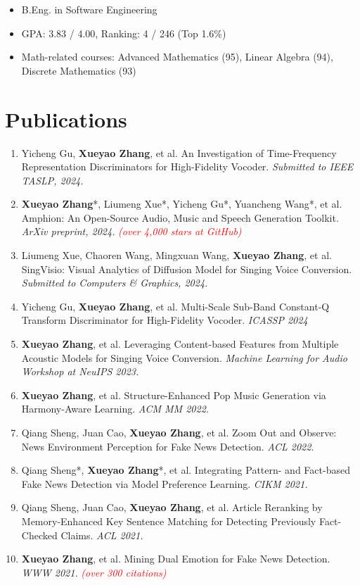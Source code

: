 \documentclass{resume}
\begin{document}
{
  \small
  \begin{itemize}
    \item B.Eng. in Software Engineering
    \item GPA: 3.83 / 4.00, Ranking: 4 / 246 (Top 1.6\%)
    \item Math-related courses: Advanced Mathematics (95), Linear Algebra (94), Discrete
          Mathematics (93)
  \end{itemize}
}

\section{Publications}

\begin{enumerate}\itemsep 0.5em
  \item Yicheng Gu, \textbf{Xueyao Zhang}, et al. An Investigation of Time-Frequency Representation Discriminators for High-Fidelity Vocoder. \textit{Submitted to IEEE TASLP, 2024.}
  \item \textbf{Xueyao Zhang}*, Liumeng Xue*, Yicheng Gu*, Yuancheng Wang*, et al. Amphion: An Open-Source Audio, Music and Speech Generation Toolkit. \textit{ArXiv preprint, 2024.} \textcolor{red}{\textit{(over 4,000 stars at GitHub)}}
  \item Liumeng Xue, Chaoren Wang, Mingxuan Wang, \textbf{Xueyao Zhang}, et al. SingVisio: Visual Analytics of Diffusion Model for Singing Voice Conversion. \textit{Submitted to Computers \& Graphics, 2024.}
  \item Yicheng Gu, \textbf{Xueyao Zhang}, et al. Multi-Scale Sub-Band Constant-Q Transform Discriminator for High-Fidelity Vocoder. \textit{ICASSP 2024}
  \item \textbf{Xueyao Zhang}, et al. Leveraging Content-based Features from Multiple Acoustic Models for Singing Voice Conversion. \textit{Machine Learning for Audio Workshop at NeuIPS 2023.}
  \item \textbf{Xueyao Zhang}, et al. Structure-Enhanced Pop Music Generation via Harmony-Aware Learning. \textit{ACM MM 2022.}
  \item Qiang Sheng, Juan Cao, \textbf{Xueyao Zhang}, et al. Zoom Out and Observe: News Environment Perception for Fake News Detection. \textit{ACL 2022}.
  \item Qiang Sheng*, \textbf{Xueyao Zhang}*, et al. Integrating Pattern- and
  Fact-based Fake News Detection via Model Preference Learning.
  \textit{CIKM 2021.}
  \item Qiang Sheng, Juan Cao, \textbf{Xueyao Zhang}, et al. Article Reranking by Memory-Enhanced Key Sentence Matching for Detecting Previously Fact-Checked Claims. \textit{ACL 2021.}
  \item \textbf{Xueyao Zhang}, et al. Mining Dual Emotion for Fake News Detection. \textit{WWW 2021.} \textcolor{red}{\textit{(over 300 citations)}}
\end{enumerate}
\end{document}
